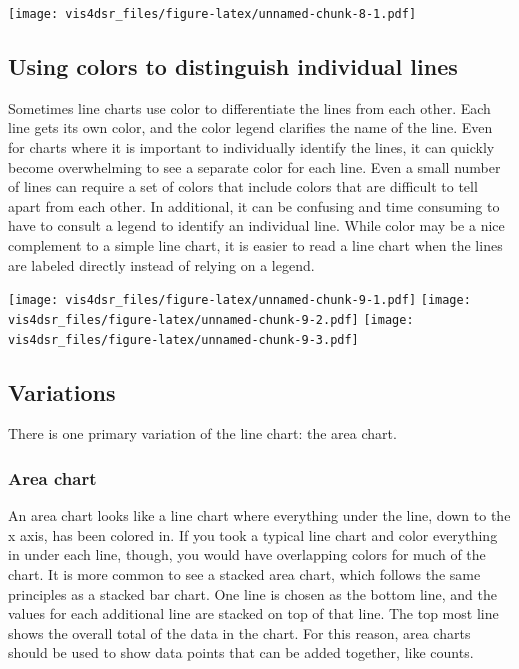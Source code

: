 \documentclass[
]{krantz}
\begin{document}
\texttt{[image: vis4dsr\_files/figure-latex/unnamed-chunk-8-1.pdf]}

\hypertarget{using-colors-to-distinguish-individual-lines}{%
\subsection{Using colors to distinguish individual lines}\label{using-colors-to-distinguish-individual-lines}}

Sometimes line charts use color to differentiate the lines from each other. Each line
gets its own color, and the color legend clarifies the name of the line. Even for
charts where it is important to individually identify the lines, it can quickly
become overwhelming to see a separate color for each line. Even a small number of
lines can require a set of colors that include colors that are difficult to tell
apart from each other. In additional, it can be confusing and time consuming to have
to consult a legend to identify an individual line. While color may be a nice
complement to a simple line chart, it is easier to read a line chart when the lines
are labeled directly instead of relying on a legend.

\texttt{[image: vis4dsr\_files/figure-latex/unnamed-chunk-9-1.pdf]} \texttt{[image: vis4dsr\_files/figure-latex/unnamed-chunk-9-2.pdf]} \texttt{[image: vis4dsr\_files/figure-latex/unnamed-chunk-9-3.pdf]}

\hypertarget{variations-2}{%
\subsection{Variations}\label{variations-2}}

There is one primary variation of the line chart: the area chart.

\hypertarget{area-chart}{%
\subsubsection{Area chart}\label{area-chart}}

An area chart looks like a line chart where everything under the line, down to the
x axis, has been colored in. If you took a typical line chart and color everything
in under each line, though, you would have overlapping colors for much of the chart.
It is more common to see a stacked area chart, which follows the same principles as
a stacked bar chart. One line is chosen as the bottom line, and the values for
each additional line are stacked on top of that line. The top most line shows the
overall total of the data in the chart. For this reason, area charts should be used
to show data points that can be added together, like counts.
\end{document}
